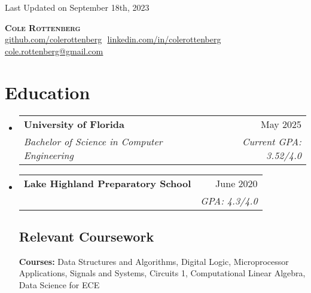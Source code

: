 \documentclass[letterpaper,11pt]{article}
\makeatletter
\newcommand{\resumeSubheading}[4]{
  \vspace{-2pt}\item
    \begin{tabular*}{0.97\textwidth}[t]{l@{\extracolsep{\fill}}r}
      \textbf{#1} & #2 \\
      \textit{\small#3} & \textit{\small #4} \\
    \end{tabular*}\vspace{-7pt}
}
\newcommand{\resumeSubHeadingListStart}{\begin{itemize}[leftmargin=0.15in, label={}]}
\newcommand{\resumeSubHeadingListEnd}{\end{itemize}}
\makeatother
\begin{document}
\begin{flushright}
  \vspace{-4pt}
  \color{gray}
  \item
  Last Updated on September 18th, 2023
\end{flushright}

\vspace{-7pt}

\begin{center}
    \textbf{\Huge \scshape Cole Rottenberg } \\ \vspace{8pt}
    \small 
    \href{https://github.com/johnDoe}{\underline{github.com/colerottenberg}} $  $
    \href{https://linkedin.com/in/colerottenberg}{\underline{linkedin.com/in/colerottenberg}} $  $
    \href{mailto:cole.rottenberg@gmail.com}
    {\underline{cole.rottenberg@gmail.com}}
\end{center}

\section{Education}
  \resumeSubHeadingListStart
  
    \resumeSubheading
      {University of Florida}{May 2025}
      {Bachelor of Science in Computer Engineering}{Current GPA: 3.52/4.0}
      
    \resumeSubheading
      {Lake Highland Preparatory School }{June 2020}
      {}{GPA: 4.3/4.0}

    \vspace{-10pt}
    \subsection{Relevant Coursework}
      \textbf{Courses:} Data Structures and Algorithms, Digital Logic, Microprocessor Applications, Signals and Systems, Circuits 1, Computational Linear Algebra, Data Science for ECE\\

  \resumeSubHeadingListEnd
\end{document}
